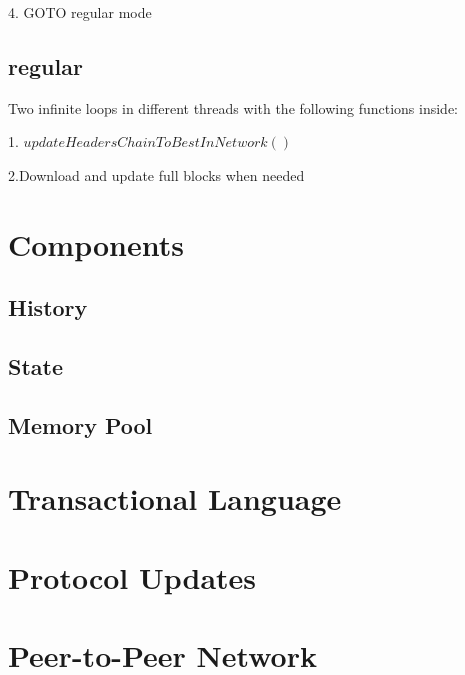 \documentclass[]{report}   %
\begin{document}
4. GOTO regular mode


\subsection{regular}

Two infinite loops in different threads with the following functions inside:

1. $updateHeadersChainToBestInNetwork()$

2.Download and update full blocks when needed



\section{Components}
\subsection{History}
\subsection{State}
\subsection{Memory Pool}

\section{Transactional Language}

\section{Protocol Updates}

\section{Peer-to-Peer Network}






\end{document}
